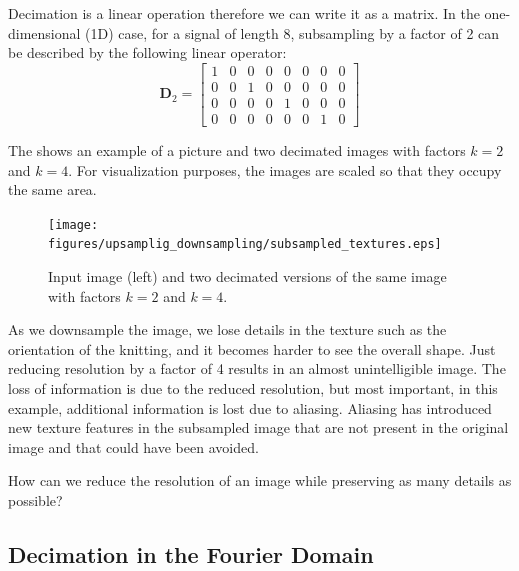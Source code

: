 Decimation is a linear operation therefore we can write it as a matrix. In the one-dimensional (1D) case, for a signal of length 8, subsampling by a factor of 2 can be described by the following linear operator:
\begin{equation}
\mathbf{D}_2 = \left[ 
\begin{array}{cccccccc}
1 & 0 & 0 & 0 & 0 & 0 & 0 & 0\\
0 & 0 & 1 & 0 & 0 & 0 & 0 & 0\\
0 & 0 & 0 & 0 & 1 & 0 & 0 & 0\\ 
0 & 0 & 0 & 0 & 0 & 0 & 1 & 0 
\end{array}
\right]
\end{equation}


The \fig{\ref{fig:subsampled_textures}} shows an example of a picture and two decimated images with factors $k=2$ and $k=4$. For visualization purposes, the images are scaled so that they occupy the same area.
\begin{figure}[h]
\centerline{
\texttt{[image: figures/upsamplig\_downsampling/subsampled\_textures.eps]}
}
\caption{Input image (left) and two decimated versions of the same image with factors $k=2$ and $k=4$.}
\label{fig:subsampled_textures}
\end{figure}

As we downsample the image, we lose details in the texture such as the orientation of the knitting, and it becomes harder to see the overall shape. Just reducing resolution by a factor of 4 results in an almost unintelligible image. The loss of information is due to the reduced resolution, but most important, in this example, additional information is lost due to aliasing. Aliasing has introduced new texture features in the subsampled image that are not present in the original image and that could have been avoided.

How can we reduce the resolution of an image while preserving as many details as possible?


\subsection{Decimation in the Fourier Domain}


